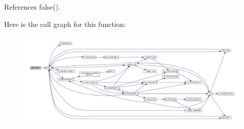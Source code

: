 References false().

Here is the call graph for this function\+:
\nopagebreak
\begin{figure}[H]
\begin{center}
\leavevmode
\includegraphics[width=350pt]{paws_8f90_a39c21619b08a3c22f19e2306efd7f766_cgraph}
\end{center}
\end{figure}
